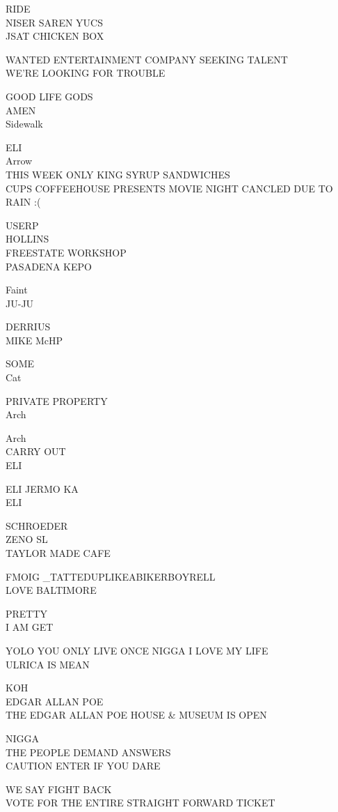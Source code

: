 \documentclass[10pt,letterpaper]{article}
\begin{document}
RIDE\\
NISER SAREN YUCS\\
JSAT CHICKEN BOX

WANTED ENTERTAINMENT COMPANY SEEKING TALENT\\
WE'RE LOOKING FOR TROUBLE

GOOD LIFE GODS\\
AMEN\\
Sidewalk

ELI\\
Arrow\\
THIS WEEK ONLY KING SYRUP SANDWICHES\\
CUPS COFFEEHOUSE PRESENTS MOVIE NIGHT CANCLED DUE TO RAIN :(

USERP\\
HOLLINS\\
FREESTATE WORKSHOP\\
PASADENA KEPO

Faint\\
JU{-}JU

DERRIUS\\
MIKE McHP

SOME\\
Cat

PRIVATE PROPERTY\\
Arch

Arch\\
CARRY OUT\\
ELI

ELI JERMO KA\\
ELI

SCHROEDER\\
ZENO SL\\
TAYLOR MADE CAFE

FMOIG \_TATTEDUPLIKEABIKERBOYRELL\\
LOVE BALTIMORE

PRETTY\\
I AM GET

YOLO YOU ONLY LIVE ONCE NIGGA I LOVE MY LIFE\\
ULRICA IS MEAN

KOH\\
EDGAR ALLAN POE\\
THE EDGAR ALLAN POE HOUSE \& MUSEUM IS OPEN

NIGGA\\
THE PEOPLE DEMAND ANSWERS\\
CAUTION ENTER IF YOU DARE

WE SAY FIGHT BACK\\
VOTE FOR THE ENTIRE STRAIGHT FORWARD TICKET
\end{document}
